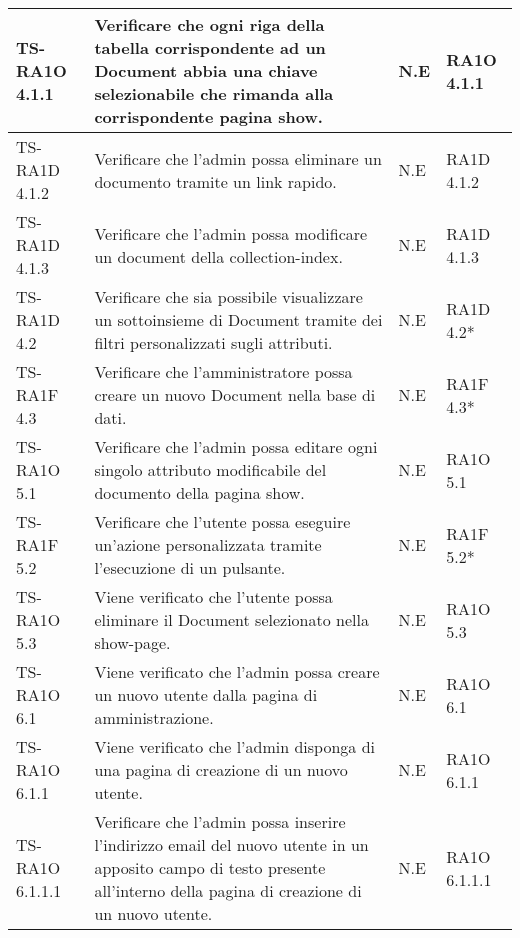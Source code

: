 \begin{center}
\begin{longtable}{| p{3cm} | p{6cm} | p{1.5cm} | p{2cm} | }
				TS-RA1O 4.1.1 & 
				Verificare che ogni riga della tabella corrispondente ad un Document abbia una chiave selezionabile che rimanda alla corrispondente pagina show.
 & N.E & RA1O 4.1.1 \newline  \\ \hline 
				TS-RA1D 4.1.2 & 
				Verificare che l'admin possa eliminare un documento tramite un link rapido. & N.E & RA1D 4.1.2 \newline  \\ \hline 
				TS-RA1D 4.1.3 & 
				Verificare che l'admin possa modificare un document della collection-index.
 & N.E & RA1D 4.1.3 \newline  \\ \hline 
				TS-RA1D 4.2 & 
				Verificare che sia possibile visualizzare un sottoinsieme di Document tramite dei filtri personalizzati sugli attributi. & N.E & RA1D 4.2*  \newline  \\ \hline 
				TS-RA1F 4.3 & 
				Verificare che l'amministratore possa creare un nuovo Document nella base di dati. & N.E & RA1F 4.3*  \newline  \\ \hline 
				TS-RA1O 5.1 & 
				Verificare che l'admin possa editare ogni singolo attributo modificabile del documento della pagina show. & N.E & RA1O 5.1 \newline  \\ \hline 
				TS-RA1F 5.2 & 
				Verificare che l'utente possa eseguire un'azione personalizzata tramite l'esecuzione di un pulsante. & N.E & RA1F 5.2*  \newline  \\ \hline 
				TS-RA1O 5.3 & 
				Viene verificato che l'utente possa eliminare il Document selezionato nella show-page. & N.E & RA1O 5.3 \newline  \\ \hline 
				TS-RA1O 6.1 & 
				Viene verificato che l'admin possa creare un nuovo utente dalla pagina di amministrazione. & N.E & RA1O 6.1 \newline  \\ \hline 
				TS-RA1O 6.1.1 & 
				Viene verificato che l'admin disponga di una pagina di creazione di un nuovo utente. & N.E & RA1O 6.1.1 \newline  \\ \hline 
				TS-RA1O 6.1.1.1 & 
				Verificare che l'admin possa inserire l'indirizzo email del nuovo utente in un apposito campo di testo presente all'interno della pagina di creazione di un nuovo utente. & N.E & RA1O 6.1.1.1 \newline  \\ \hline 

\end{longtable}
\end{center}
